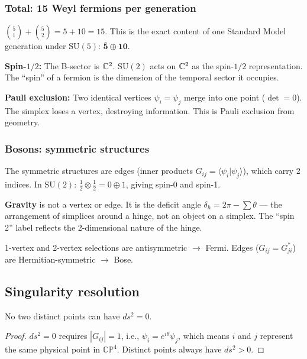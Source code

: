 \subsubsection{Total: 15 Weyl fermions per generation}

$\binom{5}{1} + \binom{5}{2} = 5 + 10 = 15$. This is the exact content of one Standard Model generation under $\text{SU}(5)$: $\bar{\mathbf{5}} \oplus \mathbf{10}$.

\textbf{Spin-$1/2$:} The B-sector is $\mathbb{C}^2$. $\text{SU}(2)$ acts on $\mathbb{C}^2$ as the spin-$1/2$ representation. The ``spin'' of a fermion is the dimension of the temporal sector it occupies.

\textbf{Pauli exclusion:} Two identical vertices $\psi_i = \psi_j$ merge into one point ($\det = 0$). The simplex loses a vertex, destroying information. This is Pauli exclusion from geometry.

\subsubsection{Bosons: symmetric structures}

The symmetric structures are edges (inner products $G_{ij} = \langle\psi_i|\psi_j\rangle$), which carry 2 indices. In $\text{SU}(2)$: $\frac{1}{2} \otimes \frac{1}{2} = 0 \oplus 1$, giving spin-0 and spin-1.

\textbf{Gravity} is not a vertex or edge. It is the deficit angle $\delta_h = 2\pi - \sum\theta$ --- the arrangement of simplices around a hinge, not an object on a simplex. The ``spin 2'' label reflects the 2-dimensional nature of the hinge.

\begin{remark}
1-vertex and 2-vertex selections are antisymmetric $\to$ Fermi. Edges ($G_{ij} = G_{ji}^*$) are Hermitian-symmetric $\to$ Bose.
\end{remark}

\subsection{Singularity resolution}

\begin{proposition}
No two distinct points can have $ds^2 = 0$.
\end{proposition}

\begin{proof}
$ds^2 = 0$ requires $|G_{ij}| = 1$, i.e., $\psi_i = e^{i\theta}\psi_j$, which means $i$ and $j$ represent the same physical point in $\mathbb{CP}^4$. Distinct points always have $ds^2 > 0$.
\end{proof}

